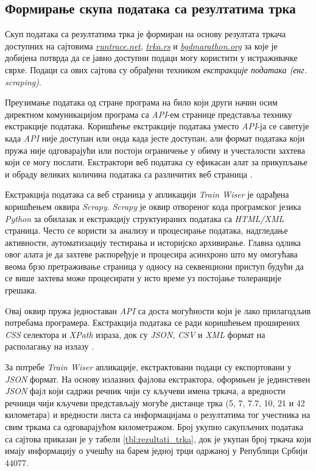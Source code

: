 \documentclass[12pt,oneside]{memoir}
\begin{document}
\subsection{Формирање скупа података са резултатима трка}
\label{subsec:scrapy_desc}

Скуп података са резултатима трка је формиран на основу резултата тркача доступних на сајтовима \href{https://www.runtrace.net}{\textit{runtrace.net}}, \href{https://www.trka.rs}{\textit{trka.rs}} и \href{https://www.bgdmarathon.org}{\textit{bgdmarathon.org}} за које је добијена потврда да се јавно доступни подаци могу користити у истраживачке сврхе. Подаци са ових сајтова су обрађени техником \textit{екстракције података (енг. scraping)}.

Преузимање података од стране програма на било који други начин осим директном комуникацијом програма са \textit{API}-ем странице представља технику екстракције података. Коришћење екстракције података уместо \textit{API}-ја се саветује када %
\textit{API} није доступан или онда када јесте доступан, али формат података који пружа није одговарајући или постоји ограничење у обиму и учесталости захтева који се могу послати. Екстрактори веб података су ефикасан алат за прикупљање и обраду великих количина података са различитих веб страница \cite{web_scraping_with_python}.

Екстракција података са веб страница у апликацији \textit{Train Wiser} је одрађена коришћењем оквира \textit{Scrapy}. \textit{Scrapy} је оквир отвореног кода програмског језика \textit{Python} за обилазак и екстракцију структуираних података са \textit{HTML/XML} страница. Често се користи за анализу и процесирање података, надгледање активности, аутоматизацију тестирања и историјско архивирање. Главна одлика овог алата је да захтеве распоређује и процесира асинхроно што му омогућава веома брзо претраживање страница у односу на секвенциони приступ будући да се више захтева може процесирати у исто време уз постојање толеранције грешака. 

Oвај оквир пружа једноставан \textit{API} са доста могућности који је лако прилагодљив потребама програмера. Екстракција података се ради коришћењем проширених \textit{CSS} селектора и \textit{XPath} израза, док су \textit{JSON}, \textit{CSV} и \textit{XML} формат на располагању на излазу \cite{scrapy_doc}.


За потребе \textit{Train Wiser} апликације, екстрактовани подаци су експортовани у \textit{JSON} формат. На основу излазних фајлова екстрактора, оформњен је јединстевен \textit{JSON} фајл који садржи речник чији су кључеви имена тркача, а вредности речници чији кључеви представљају могуће дистанце трка (5, 7, 7.7, 10, 21 и 42 километара) и вредности листа са информацијама о резултатима тог учестника на свим тркама са одговарајућом километражом. Број укупно сакупљених података са сајтова приказан је у табели \ref{tbl:rezultati_trka}, док је укупан број тркача који имају информацију о учешћу на барем једној трци одржаној у Републици Србији 44077. 
\end{document}
